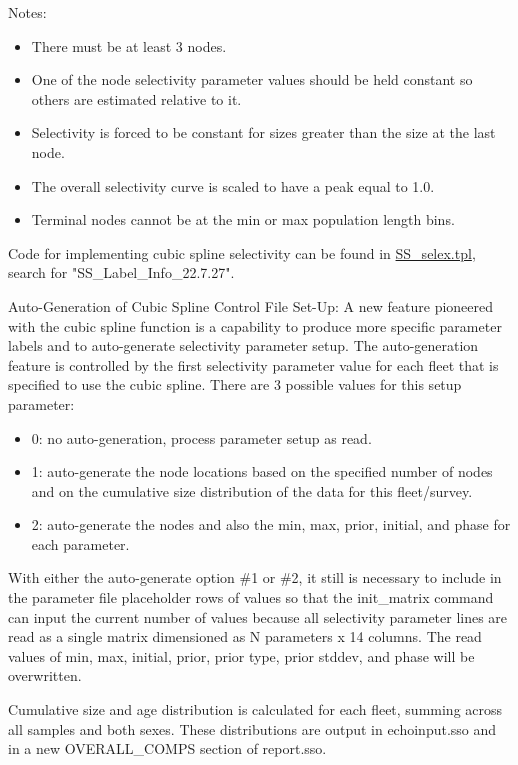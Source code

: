 Notes:
	\begin{itemize}
		\item There must be at least 3 nodes.
		\item One of the node selectivity parameter values should be held constant so others are estimated relative to it.
		\item Selectivity is forced to be constant for sizes greater than the size at the last node.
		\item The overall selectivity curve is scaled to have a peak equal to 1.0.
		\item Terminal nodes cannot be at the min or max population length bins.
	\end{itemize}
	
Code for implementing cubic spline selectivity can be found in \href{https://github.com/nmfs-stock-synthesis/stock-synthesis/blob/main/SS_selex.tpl}{SS\_selex.tpl}, search for "SS\_Label\_Info\_22.7.27".
	
Auto-Generation of Cubic Spline Control File Set-Up: A new feature pioneered with the cubic spline function is a capability to produce more specific parameter labels and to auto-generate selectivity parameter setup.  The auto-generation feature is controlled by the first selectivity parameter value for each fleet that is specified to use the cubic spline.  There are 3 possible values for this setup parameter:
	\begin{itemize}
		\item 0: no auto-generation, process parameter setup as read.
		\item 1: auto-generate the node locations based on the specified number of nodes and on the cumulative size distribution of the data for this fleet/survey.
		\item 2: auto-generate the nodes and also the min, max, prior, initial, and phase for each parameter.  
	\end{itemize}
	
With either the auto-generate option \#1 or \#2, it still is necessary to include in the parameter file placeholder rows of values so that the init\_matrix command can input the current number of values because all selectivity parameter lines are read as a single matrix dimensioned as N parameters x 14 columns.  The read values of min, max, initial, prior, prior type, prior stddev, and phase will be overwritten.
	
Cumulative size and age distribution is calculated for each fleet, summing across all samples and both sexes. These distributions are output in echoinput.sso and in a new OVERALL\_COMPS section of report.sso.
	
